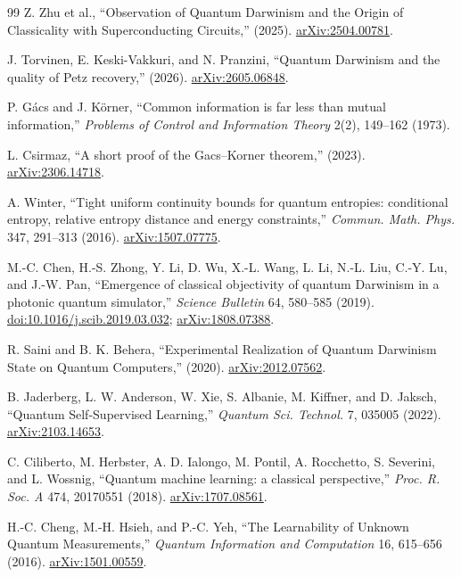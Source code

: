 \begin{thebibliography}{99}
Z. Zhu et al., ``Observation of Quantum Darwinism and the Origin of Classicality with Superconducting Circuits,'' (2025). \href{https://arxiv.org/abs/2504.00781}{arXiv:2504.00781}.

J. Torvinen, E. Keski-Vakkuri, and N. Pranzini, ``Quantum Darwinism and the quality of Petz recovery,'' (2026). \href{https://arxiv.org/abs/2605.06848}{arXiv:2605.06848}.

P. G\'acs and J. K\"orner, ``Common information is far less than mutual information,'' \emph{Problems of Control and Information Theory} 2(2), 149--162 (1973).

L. Csirmaz, ``A short proof of the Gacs--Korner theorem,'' (2023). \href{https://arxiv.org/abs/2306.14718}{arXiv:2306.14718}.

A. Winter, ``Tight uniform continuity bounds for quantum entropies: conditional entropy, relative entropy distance and energy constraints,'' \emph{Commun. Math. Phys.} 347, 291--313 (2016). \href{https://arxiv.org/abs/1507.07775}{arXiv:1507.07775}.

M.-C. Chen, H.-S. Zhong, Y. Li, D. Wu, X.-L. Wang, L. Li, N.-L. Liu, C.-Y. Lu, and J.-W. Pan, ``Emergence of classical objectivity of quantum Darwinism in a photonic quantum simulator,'' \emph{Science Bulletin} 64, 580--585 (2019). \href{https://doi.org/10.1016/j.scib.2019.03.032}{doi:10.1016/j.scib.2019.03.032}; \href{https://arxiv.org/abs/1808.07388}{arXiv:1808.07388}.

R. Saini and B. K. Behera, ``Experimental Realization of Quantum Darwinism State on Quantum Computers,'' (2020). \href{https://arxiv.org/abs/2012.07562}{arXiv:2012.07562}.

B. Jaderberg, L. W. Anderson, W. Xie, S. Albanie, M. Kiffner, and D. Jaksch, ``Quantum Self-Supervised Learning,'' \emph{Quantum Sci. Technol.} 7, 035005 (2022). \href{https://arxiv.org/abs/2103.14653}{arXiv:2103.14653}.

C. Ciliberto, M. Herbster, A. D. Ialongo, M. Pontil, A. Rocchetto, S. Severini, and L. Wossnig, ``Quantum machine learning: a classical perspective,'' \emph{Proc. R. Soc. A} 474, 20170551 (2018). \href{https://arxiv.org/abs/1707.08561}{arXiv:1707.08561}.

H.-C. Cheng, M.-H. Hsieh, and P.-C. Yeh, ``The Learnability of Unknown Quantum Measurements,'' \emph{Quantum Information and Computation} 16, 615--656 (2016). \href{https://arxiv.org/abs/1501.00559}{arXiv:1501.00559}.


\end{thebibliography}
